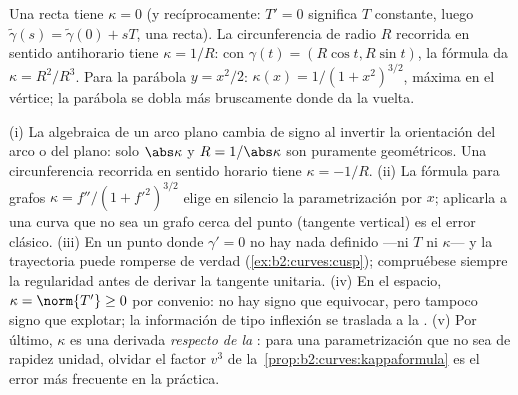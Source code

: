 \begin{example}\label{ex:b2:curves:kappaexamples}
Una recta tiene $\kappa = 0$ (y recíprocamente: $T' = 0$ significa
$T$ constante, luego $\tilde\gamma(s) = \tilde\gamma(0) + sT$, una
recta). La circunferencia de radio $R$ recorrida en sentido
antihorario tiene $\kappa = 1/R$: con $\gamma(t) = (R\cos t, R\sin
t)$, la fórmula da $\kappa = R^2/R^3$. Para la parábola $y = x^2/2$:
$\kappa(x) = 1/(1 + x^2)^{3/2}$, máxima en el vértice; la parábola se
dobla más bruscamente donde da la vuelta.
\end{example}

\begin{remark}
(i) La  algebraica de un arco plano cambia de signo al
invertir la orientación del arco o del plano: solo $\abs\kappa$ y $R
= 1/\abs\kappa$ son puramente geométricos. Una circunferencia
recorrida en sentido horario tiene $\kappa = -1/R$. (ii) La fórmula
para grafos $\kappa = f''/(1 + f'^2)^{3/2}$ elige en silencio la
parametrización por $x$; aplicarla a una curva que no sea un grafo
cerca del punto (tangente vertical) es el error clásico. (iii) En un
punto donde $\gamma' = 0$ no hay nada definido ---ni $T$ ni
$\kappa$--- y la trayectoria puede romperse de verdad
(\cref{ex:b2:curves:cusp}); compruébese siempre la regularidad antes
de derivar la tangente unitaria. (iv) En el espacio, $\kappa =
\norm{T'} \geq 0$ por convenio: no hay signo que equivocar, pero
tampoco signo que explotar; la información de tipo inflexión se
traslada a la . (v) Por último, $\kappa$ es una derivada
\emph{respecto de la }: para una parametrización que
no sea de rapidez unidad, olvidar el factor $v^3$ de la~\cref{prop:b2:curves:kappaformula} es el error más frecuente en la
práctica.
\end{remark}

